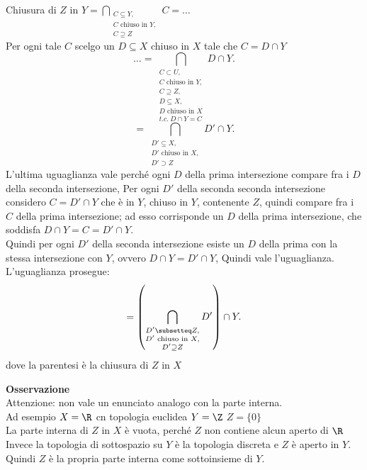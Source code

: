 \documentclass{article}
\begin{document}
	 \begin{dimo}
		 Chiusura di $Z $ in $Y = \displaystyle \bigcap_{\substack{C\subseteq Y,\\ C\text{ chiuso in } Y,\\ C\supseteq Z}}C = \ldots $ \\
		 Per ogni tale $C$ scelgo un $D\subseteq X$ chiuso in $X$ tale che $C = D\cap Y$\\
		  \[
			  \ldots = \bigcap_{\substack{C\subset U,\\ C\text{ chiuso in } Y,\\ C\supseteq Z,\\ D\subseteq X,\\ D \text{ chiuso in } X \\ t.c. \ D\cap Y = C}}D\cap Y 
		 .\] 
		 \[
			 = \bigcap_{\substack{D'\subseteq X,\\ D'\text{ chiuso in } X,\\ D'\supset Z}}D'\cap Y
		 .\] 
		 L'ultima uguaglianza vale perché ogni $D$ della prima intersezione compare fra i $D$ della seconda intersezione, Per ogni $D'$ della seconda seconda intersezione considero $C = D'\cap Y$ che è in  $Y$, chiuso in $Y$, contenente $Z$, quindi compare fra i  $C$ della prima intersezione; ad esso corrisponde un $D$ della prima intersezione, che soddisfa $D\cap Y = C =D'\cap Y.$\\
		 Quindi per ogni  $D'$ della seconda intersezione esiste un $D$ della prima con la stessa intersezione con $Y$, ovvero  $D\cap Y = D'\cap Y$, Quindi vale l'uguaglianza.\\
		 L'uguaglianza prosegue:\\
		  \[
			  = \left( \bigcap_{\substack{D'\subsetteq Z,\\ D'\text{ chiuso in } X,\\ D'\supseteq Z}} D' \right)\cap Y
		 .\] 
		 dove la parentesi è la chiusura di $Z$ in $X$
	 \end{dimo}
	 \textbf{Osservazione}\\
	 Attenzione: non vale un enunciato analogo con la parte interna.\\
	 Ad esempio $X = \R$ cn topologia euclidea $Y = \Z$  $Z= \{0\}$\\
	 La parte interna di  $Z$ in $X$ è vuota, perché $Z$ non contiene alcun aperto di $\R$\\
	 Invece la topologia di sottospazio su  $Y$ è la topologia discreta e $Z$ è aperto in $Y$.\\
	 Quindi  $Z$ è la propria parte interna come sottoinsieme di $Y$.
\end{document}
